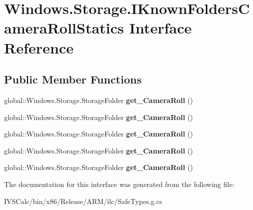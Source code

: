 \hypertarget{interface_windows_1_1_storage_1_1_i_known_folders_camera_roll_statics}{}\section{Windows.\+Storage.\+I\+Known\+Folders\+Camera\+Roll\+Statics Interface Reference}
\label{interface_windows_1_1_storage_1_1_i_known_folders_camera_roll_statics}
\subsection*{Public Member Functions}
\begin{DoxyCompactItemize}
\item 
\mbox{\label{interface_windows_1_1_storage_1_1_i_known_folders_camera_roll_statics_ac95f541ca0f91c81405c685109783be9}} 
global\+::\+Windows.\+Storage.\+Storage\+Folder {\bfseries get\+\_\+\+Camera\+Roll} ()
\item 
\mbox{\label{interface_windows_1_1_storage_1_1_i_known_folders_camera_roll_statics_ac95f541ca0f91c81405c685109783be9}} 
global\+::\+Windows.\+Storage.\+Storage\+Folder {\bfseries get\+\_\+\+Camera\+Roll} ()
\item 
\mbox{\label{interface_windows_1_1_storage_1_1_i_known_folders_camera_roll_statics_ac95f541ca0f91c81405c685109783be9}} 
global\+::\+Windows.\+Storage.\+Storage\+Folder {\bfseries get\+\_\+\+Camera\+Roll} ()
\item 
\mbox{\label{interface_windows_1_1_storage_1_1_i_known_folders_camera_roll_statics_ac95f541ca0f91c81405c685109783be9}} 
global\+::\+Windows.\+Storage.\+Storage\+Folder {\bfseries get\+\_\+\+Camera\+Roll} ()
\item 
\mbox{\label{interface_windows_1_1_storage_1_1_i_known_folders_camera_roll_statics_ac95f541ca0f91c81405c685109783be9}} 
global\+::\+Windows.\+Storage.\+Storage\+Folder {\bfseries get\+\_\+\+Camera\+Roll} ()
\end{DoxyCompactItemize}


The documentation for this interface was generated from the following file\+:\begin{DoxyCompactItemize}
\item 
I\+V\+S\+Calc/bin/x86/\+Release/\+A\+R\+M/ilc/Safe\+Types.\+g.\+cs\end{DoxyCompactItemize}
